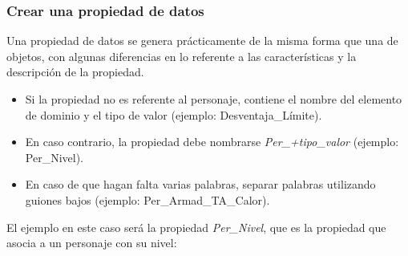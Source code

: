 \subsubsection{Crear una propiedad de datos}\label{CreateDataProp}
Una propiedad de datos se genera prácticamente de la misma forma que una de objetos, con algunas diferencias en lo referente 
a las características y la descripción de la propiedad. 

\begin{itemize}
    \item Si la propiedad no es referente al personaje, contiene el nombre del elemento de dominio y el tipo de valor 
    (ejemplo: Desventaja\_Límite).
    \item En caso contrario, la propiedad debe nombrarse \textit{Per\_+tipo\_valor} (ejemplo: Per\_Nivel).
    \item En caso de que hagan falta varias palabras, separar palabras utilizando guiones bajos (ejemplo: Per\_Armad\_TA\_Calor).
\end{itemize}

El ejemplo en este caso será la propiedad \textit{Per\_Nivel}, que es 
la propiedad que asocia a un personaje con su nivel:

